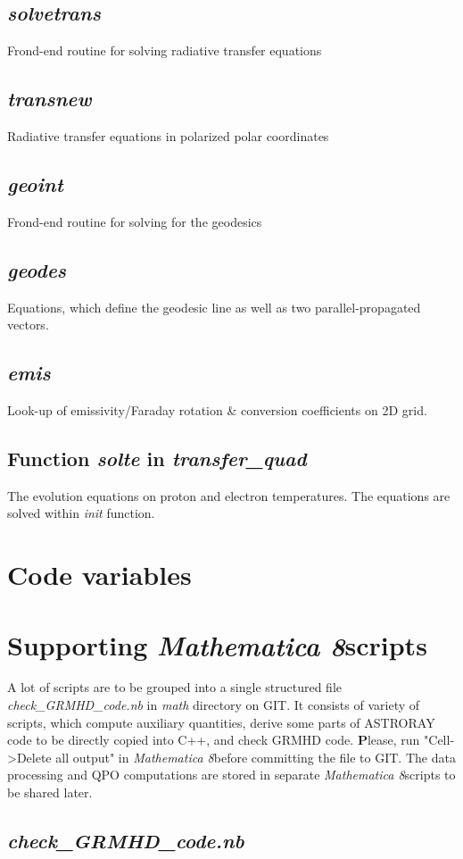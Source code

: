 \documentclass{emulateapj}
\newcommand{\mat}{\textit{Mathematica 8}}
\begin{document}
\subsection{\textit{solvetrans}}
Frond-end routine for solving radiative transfer equations
\subsection{\textit{transnew}}
Radiative transfer equations in polarized polar coordinates
\subsection{\textit{geoint}}
Frond-end routine for solving for the geodesics
\subsection{\textit{geodes}}
Equations, which define the geodesic line as well as two parallel-propagated vectors.
\subsection{\textit{emis}}
Look-up of emissivity/Faraday rotation \& conversion coefficients on 2D grid.
\subsection{Function \textit{solte} in \textit{transfer\_quad}}
The evolution equations on proton and electron temperatures. The equations are solved within \textit{init} function.

\section{Code variables}


\section{Supporting \mat scripts}
A lot of scripts are to be grouped into a single structured file \textit{check\_GRMHD\_code.nb} in \textit{math} directory on GIT.
It consists of variety of scripts, which compute auxiliary quantities, derive some parts of ASTRORAY code to be directly copied into C++, and check GRMHD code.
{\textbf Please, run "Cell->Delete all output" in \mat before committing the file to GIT.}
The data processing and QPO computations are stored in separate \mat scripts to be shared later.
\subsection{\textit{check\_GRMHD\_code.nb}}
\end{document}
